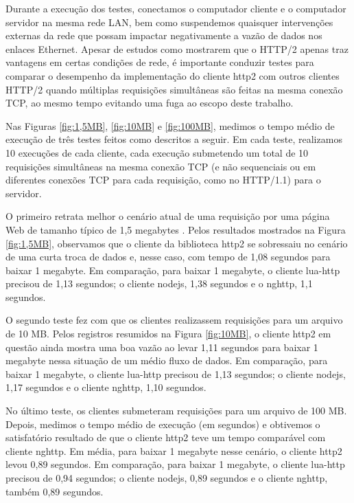 Durante a execução dos testes, conectamos o computador cliente e o computador servidor na mesma rede LAN, bem como suspendemos quaisquer intervenções externas da rede que possam impactar negativamente a vazão de dados nos enlaces Ethernet. Apesar de estudos como \cite{Saxce7179400, Oda8319285} mostrarem que o HTTP/2 apenas traz vantagens em certas condições de rede, é importante conduzir testes para comparar o desempenho da implementação do cliente http2 com outros clientes HTTP/2 quando múltiplas requisições simultâneas são feitas na mesma conexão TCP, ao mesmo tempo evitando uma fuga ao escopo deste trabalho.

Nas Figuras \ref{fig:1,5MB}, \ref{fig:10MB} e \ref{fig:100MB}, medimos o tempo médio de execução de três testes feitos como descritos a seguir. Em cada teste, realizamos 10 execuções de cada cliente, cada execução submetendo um total de 10 requisições simultâneas na mesma conexão TCP (e não sequenciais ou em diferentes conexões TCP para cada requisição, como no HTTP/1.1) para o servidor.

O primeiro retrata melhor o cenário atual de uma requisição por uma página Web de tamanho típico de 1,5 megabytes \cite{HTTPArchive}. Pelos resultados mostrados na Figura \ref{fig:1,5MB}, observamos que o cliente da biblioteca http2 se sobressaiu no cenário de uma curta troca de dados e, nesse caso, com tempo de 1,08 segundos para baixar 1 megabyte. Em comparação, para baixar 1 megabyte, o cliente lua-http precisou de 1,13 segundos; o cliente nodejs, 1,38 segundos e o nghttp, 1,1 segundos.

O segundo teste fez com que os clientes realizassem requisições para um arquivo de 10 MB. Pelos registros resumidos na Figura \ref{fig:10MB}, o cliente http2 em questão ainda mostra uma boa vazão ao levar 1,11 segundos para baixar 1 megabyte nessa situação de um médio fluxo de dados. Em comparação, para baixar 1 megabyte, o cliente lua-http precisou de 1,13 segundos; o cliente nodejs, 1,17 segundos e o cliente nghttp, 1,10 segundos.

No último teste, os clientes submeteram requisições para um arquivo de 100 MB. Depois, medimos o tempo médio de execução (em segundos) e obtivemos o satisfatório resultado de que o cliente http2 teve um tempo comparável com cliente nghttp. Em média, para baixar 1 megabyte nesse cenário, o cliente http2 levou 0,89 segundos. Em comparação, para baixar 1 megabyte, o cliente lua-http precisou de 0,94 segundos; o cliente nodejs, 0,89 segundos e o cliente nghttp, também 0,89 segundos.

